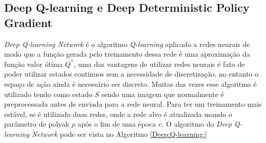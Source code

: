 \subsection{Deep Q-learning e Deep Deterministic Policy Gradient }
\textit{Deep Q-learning Network} é o algoritmo \textit{Q-learning}
aplicado a redes neurais de modo que a função gerada pelo treinamento
dessa rede é uma aproximação da função valor ótima $Q^*$, uma das vantagens
de utilizar redes neurais é fato de poder utilizar estados continuos sem a
necessidade de discretização, no entanto o espaço de ação ainda é necessário
ser discreto. Muitas das vezes esse algoritmo é utilizado
tendo como estado $S$ sendo uma imagem que normalmente é preprocessada
antes de enviada para a rede neural. Para ter um treinamento mais estável,
se é utilizado duas redes, onde a rede alvo é atualizada usando o parâmetro
de polyak $\rho$ após o fim de uma época $e$.
O algoritmo do \textit{Deep Q-learning Network}
pode ser vista no Algoritmo \ref{Deep:Q-learning:}

